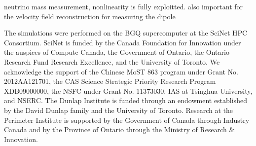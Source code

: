\documentclass[aps,prd,twocolumn,showpacs,superscriptaddress,groupedaddress,nofootinbib]{revtex4}  %
\begin{document}
neutrino mass measurement, nonlinearity is fully exploitted. also important for
the velocity field reconstruction for measuring the dipole


The simulations were performed on the BGQ supercomputer at the SciNet HPC 
Consortium. SciNet is funded by the Canada Foundation for Innovation under 
the auspices of Compute Canada, the Government of Ontario, the Ontario Research 
Fund Research Excellence, and the University of Toronto.
We acknowledge the support of the Chinese MoST 863 program under Grant 
No. 2012AA121701, the CAS Science Strategic Priority Research Program 
XDB09000000, the NSFC under Grant No. 11373030, IAS at Tsinghua University, 
 and NSERC.
The Dunlap Institute is funded through an endowment established by the David Dunlap family and the University of Toronto.
Research at the Perimeter Institute is supported by the Government of Canada
through Industry Canada and by the Province of Ontario through the Ministry of
Research $\&$ Innovation.



\end{document}
